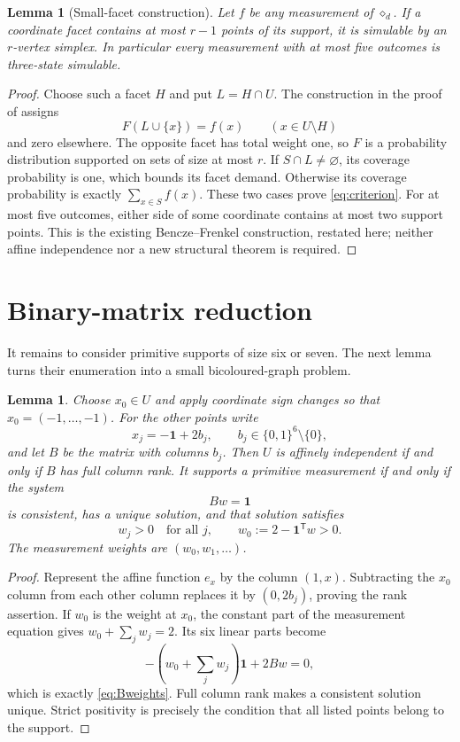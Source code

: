 \documentclass[11pt]{article}
\newtheorem{lemma}[theorem]{Lemma}
\begin{document}
\begin{lemma}[Small-facet construction]\label{lem:small}
Let $f$ be any measurement of $\diamond_d$. If a coordinate facet contains at
most $r-1$ points of its support, it is simulable by an $r$-vertex simplex.
In particular every measurement with at most five outcomes is three-state
simulable.
\end{lemma}
\begin{proof}
Choose such a facet $H$ and put $L=H\cap U$. The construction in the proof of
\cite[Theorem~2.2]{BenczeFrenkel} assigns
\[
 F(L\cup\{x\})=f(x)\qquad(x\in U\setminus H)
\]
and zero elsewhere. The opposite facet has total weight one, so $F$ is a
probability distribution supported on sets of size at most $r$.
If $S\cap L\ne\varnothing$, its coverage probability is one, which bounds
its facet demand. Otherwise its coverage probability is exactly
$\sum_{x\in S}f(x)$. These two cases prove \eqref{eq:criterion}.
For at most five outcomes, either side of some coordinate contains at most
two support points. This is the existing Bencze--Frenkel construction,
restated here; neither affine independence nor a new structural theorem is
required.
\end{proof}

\section{Binary-matrix reduction}

It remains to consider primitive supports of size six or seven. The next
lemma turns their enumeration into a small bicoloured-graph problem.

\begin{lemma}\label{lem:binary}
Choose $x_0\in U$ and apply coordinate sign changes so that
$x_0=(-1,\ldots,-1)$. For the other points write
\[
 x_j=-\boldsymbol 1+2b_j,
 \qquad b_j\in\{0,1\}^6\setminus\{0\},
\]
and let $B$ be the matrix with columns $b_j$. Then $U$ is affinely
independent if and only if $B$ has full column rank. It supports a primitive
measurement if and only if the system
\begin{equation}\label{eq:Bweights}
 Bw=\boldsymbol 1
\end{equation}
is consistent, has a unique solution, and that solution satisfies
\[
 w_j>0\quad\text{for all }j,
 \qquad w_0:=2-\boldsymbol 1^{\mathsf T}w>0.
\]
The measurement weights are $(w_0,w_1,\ldots)$.
\end{lemma}
\begin{proof}
Represent the affine function $e_x$ by the column $(1,x)$. Subtracting the
$x_0$ column from each other column replaces it by $(0,2b_j)$, proving the
rank assertion. If $w_0$ is the weight at $x_0$, the constant part of the
measurement equation gives $w_0+\sum_jw_j=2$. Its six linear parts become
\[
 -\left(w_0+\sum_jw_j\right)\boldsymbol 1+2Bw=0,
\]
which is exactly \eqref{eq:Bweights}. Full column rank makes a consistent
solution unique. Strict positivity is precisely the condition that all
listed points belong to the support.
\end{proof}
\end{document}
